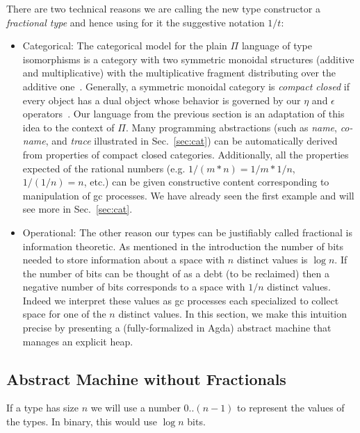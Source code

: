 \documentclass[sigplan,10pt,review,anonymous]{acmart}
\newcommand{\oneover}[1]{1/#1}
\begin{document}
There are two technical reasons we are calling the new type constructor a
\emph{fractional type} and hence using for it the suggestive notation
$\oneover{t}$:
\begin{itemize}
\item Categorical: The categorical model for the plain $\Pi$ language
  of type isomorphisms is a category with two symmetric monoidal
  structures (additive and multiplicative) with the multiplicative
  fragment distributing over the additive one~\cite{XXX}. Generally,
  a symmetric monoidal category is \emph{compact closed} if every
  object has a dual object whose behavior is governed by our $\eta$
  and $\epsilon$ operators~\cite{XXX}. Our language from the previous
  section is an adaptation of this idea to the context of $\Pi$. Many
  programming abstractions (such as \emph{name}, \emph{co-name}, and
  \emph{trace} illustrated in Sec.~\ref{sec:cat}) can be automatically
  derived from properties of compact closed categories. Additionally,
  all the properties expected of the rational numbers
  (e.g. $\oneover{(m*n)} = \oneover{m}*\oneover{n}$,
  $\oneover{(\oneover{n})}=n$, etc.) can be given constructive content
  corresponding to manipulation of gc processes. We have already seen
  the first example and will see more in Sec.~\ref{sec:cat}.

\item Operational: The other reason our types can be justifiably
  called fractional is information theoretic. As mentioned in the
  introduction the number of bits needed to store information about a
  space with $n$ distinct values is $\log{n}$. If the number of bits
  can be thought of as a debt (to be reclaimed) then a negative number
  of bits corresponds to a space with $\oneover{n}$ distinct
  values. Indeed we interpret these values as gc processes each
  specialized to collect space for one of the $n$ distinct values. In
  this section, we make this intuition precise by presenting a
  (fully-formalized in Agda) abstract machine that manages an explicit
  heap. 
\end{itemize}

\subsection{Abstract Machine without Fractionals}


If a type has size $n$ we will use a number $0..(n-1)$ to represent
the values of the types. In binary, this would use $\log{n}$ bits.
\end{document}
